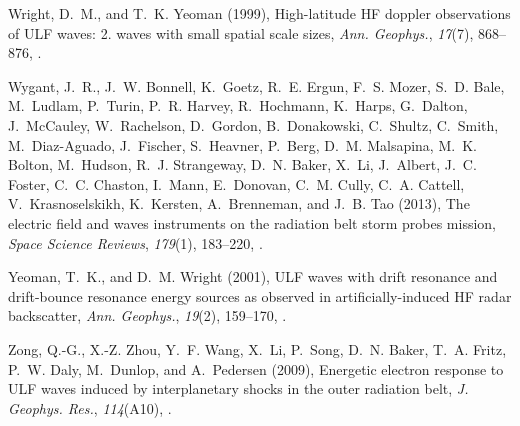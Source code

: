 \documentclass[draft,linenumbers]{agujournal}
\begin{document}
\begin{thebibliography}{50}
Wright, D.~M., and T.~K. Yeoman (1999), High-latitude {HF} doppler observations
  of {ULF} waves: 2. waves with small spatial scale sizes, \textit{Ann.
  Geophys.}, \textit{17}(7), 868--876, .

Wygant, J.~R., J.~W. Bonnell, K.~Goetz, R.~E. Ergun, F.~S. Mozer, S.~D. Bale,
  M.~Ludlam, P.~Turin, P.~R. Harvey, R.~Hochmann, K.~Harps, G.~Dalton,
  J.~McCauley, W.~Rachelson, D.~Gordon, B.~Donakowski, C.~Shultz, C.~Smith,
  M.~Diaz-Aguado, J.~Fischer, S.~Heavner, P.~Berg, D.~M. Malsapina, M.~K.
  Bolton, M.~Hudson, R.~J. Strangeway, D.~N. Baker, X.~Li, J.~Albert, J.~C.
  Foster, C.~C. Chaston, I.~Mann, E.~Donovan, C.~M. Cully, C.~A. Cattell,
  V.~Krasnoselskikh, K.~Kersten, A.~Brenneman, and J.~B. Tao (2013), The
  electric field and waves instruments on the radiation belt storm probes
  mission, \textit{Space Science Reviews}, \textit{179}(1), 183--220,
  .

Yeoman, T.~K., and D.~M. Wright (2001), {ULF} waves with drift resonance and
  drift-bounce resonance energy sources as observed in artificially-induced
  {HF} radar backscatter, \textit{Ann. Geophys.}, \textit{19}(2), 159--170,
  .

Zong, Q.-G., X.-Z. Zhou, Y.~F. Wang, X.~Li, P.~Song, D.~N. Baker, T.~A. Fritz,
  P.~W. Daly, M.~Dunlop, and A.~Pedersen (2009), Energetic electron response to
  {ULF} waves induced by interplanetary shocks in the outer radiation belt,
  \textit{J. Geophys. Res.}, \textit{114}(A10), .

\end{thebibliography}


%
\end{document}
